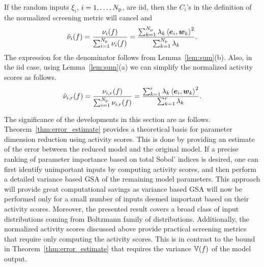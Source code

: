 \begin{remark}
If the random inputs $\xi_i$, $i = 1, \ldots, {N_\text{p}}$, are iid, then 
the $C_i$'s in the definition of the normalized screening metric will cancel and 
\[
    \tilde{\nu}_i(f) = \frac{\nu_i(f)}{\sum_{i=1}^\Np \nu_i(f)} 
      = \frac{\sum_{k=1}^\Np \lambda_k \ip{\vec{e}_i}{\vec{w}_k}^2}{\sum_{k = 1}^\Np \lambda_k}.
\]
The expression for the denominator follows from Lemma~\ref{lem:sum}(b). 
Also, in the iid case, using Lemma~\ref{lem:sum}(a) we can simplify the normalized activity scores as follows. 
\[
   \actt{f}{i}{r} =  \frac{\act{f}{i}{r}}{\sum_{i=1}^\Np \act{f}{i}{r}} = 
                     \frac{\sum_{k=1}^r \lambda_k \ip{\vec{e}_i}{\vec{w}_k}^2}
                          {\sum_{k = 1}^r \lambda_k}.
\]
\end{remark}

The significance of the developments in this section are as follows.
Theorem~\ref{thm:error_estimate} provides a theoretical basis for parameter dimension
reduction using activity scores. This is done by providing an estimate of the
error between the reduced model and the original model. If a precise ranking of
parameter importance based on total Sobol' indices is desired, one
can first identify unimportant inputs by computing activity scores, and then
perform a detailed variance based GSA of the remaining model parameters. This approach will 
provide great computational savings as variance based GSA will now be performed only
for a small number of
inputs deemed important based on their activity scores. Moreover, the
presented result covers a broad class of input distributions coming from 
Boltzmann family of distributions.
Additionally, the normalized activity scores discussed above provide practical
screening metrics that require only computing the activity scores. This is in
contrast to the bound in Theorem~\ref{thm:error_estimate} that requires the
variance $\mathbb{V}(f)$ of the model output.
